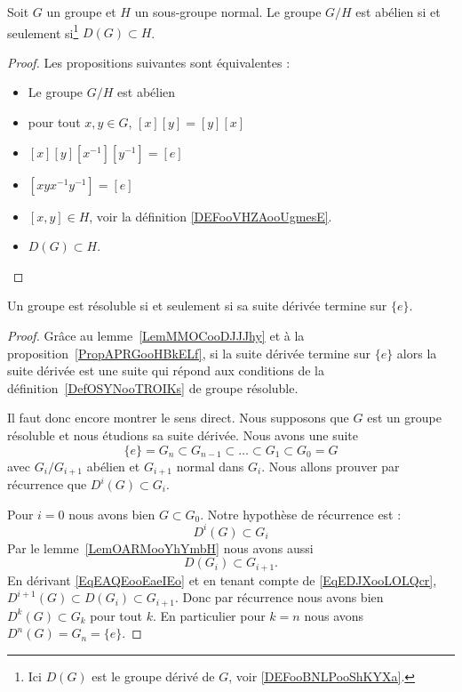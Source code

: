 \begin{lemma}   \label{LemOARMooYhYmbH}
    Soit \( G\) un groupe et \( H\) un sous-groupe normal. Le groupe \( G/H\) est abélien si et seulement si\footnote{Ici \( D(G)\) est le groupe dérivé de \( G\), voir \ref{DEFooBNLPooShKYXa}.} \( D(G)\subset H\).
\end{lemma}

\begin{proof}
	Les propositions suivantes sont équivalentes :
	\begin{itemize}
		\item Le groupe \( G/H\) est abélien
		\item pour tout \( x,y\in G\), \( [x][y]=[y][x]\)
		\item \( [x][y][x^{-1}][y^{-1}]=[e]\)
		\item \( [xyx^{-1}y^{-1}] =[e]\)
        \item \( [x,y]\in H\), voir la définition  \ref{DEFooVHZAooUgmesE}.
		\item \( D(G)\subset H\).
	\end{itemize}
\end{proof}

\begin{proposition} \label{PropRWYZooTarnmm}
	Un groupe est résoluble si et seulement si sa suite dérivée termine sur \( \{ e \}\).
\end{proposition}

\begin{proof}
	Grâce au lemme~\ref{LemMMOCooDJJJhy} et à la proposition~\ref{PropAPRGooHBkELf}, si la suite dérivée termine sur \( \{ e \}\) alors la suite dérivée est une suite qui répond aux conditions de la définition~\ref{DefOSYNooTROIKs} de groupe résoluble.

	Il faut donc encore montrer le sens direct. Nous supposons que \( G\) est un groupe résoluble et nous étudions sa suite dérivée. Nous avons une suite
	\begin{equation}
		\{ e \}=G_n\subset G_{n-1}\subset\ldots\subset G_1\subset G_0=G
	\end{equation}
	avec \( G_i/G_{i+1}\) abélien et \( G_{i+1}\) normal dans \( G_i\). Nous allons prouver par récurrence que \( D^i(G)\subset G_i\).

	Pour \( i=0\) nous avons bien \( G\subset G_0\). Notre hypothèse de récurrence est :
	\begin{equation}    \label{EqEAQEooEaeIEo}
		D^i(G)\subset G_i
	\end{equation}
	Par le lemme~\ref{LemOARMooYhYmbH} nous avons aussi
	\begin{equation}    \label{EqEDJXooLOLQcr}
		D(G_i)\subset G_{i+1}.
	\end{equation}
    En dérivant \eqref{EqEAQEooEaeIEo} et en tenant compte de \eqref{EqEDJXooLOLQcr}, \( D^{i+1}(G)\subset D(G_i)\subset G_{i+1}\). Donc par récurrence nous avons bien \( D^k(G)\subset G_k\) pour tout \( k\). En particulier pour \( k=n\) nous avons \( D^n(G)=G_n=\{ e \}\).
\end{proof}

